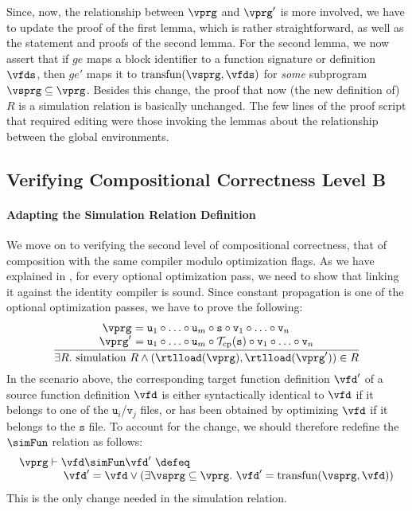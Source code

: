 Since, now, the relationship between $\vprg$ and $\vprg'$ is more involved, 
we have to update the proof of the first lemma, which is rather straightforward,
as well as the statement and proofs of the second lemma.
For the second lemma, we now assert that 
if $ge$ maps a block identifier to a function signature or definition $\vfds$, 
then $ge'$ maps it to $\mathrm{transfun}(\vsprg,\vfds)$ for \emph{some} subprogram $\vsprg\subseteq\vprg$.
Besides this change, 
the proof that now (the new definition of) $R$ is a simulation relation is basically unchanged.
The few lines of the proof script that required editing were those invoking the lemmas about the relationship between the global environments.


\subsection{Verifying Compositional Correctness Level B}

\paragraph{Adapting the Simulation Relation Definition}

We move on to verifying the second level of compositional correctness, that of composition with the same compiler modulo optimization flags.
As we have explained in , for every optional optimization pass, we need to show that linking it against the identity compiler is sound.
Since constant propagation is one of the optional optimization passes, we have to prove the following:
\[
\frac{
\begin{array}{@{}r@{~}l@{}}
\vprg &= \mathtt{u}_1\circ \ldots \circ \mathtt{u}_m\circ\mathtt{s} \circ \mathtt{v}_1\circ \ldots \circ \mathtt{v}_n\\
\vprg' &= \mathtt{u}_1\circ \ldots \circ \mathtt{u}_m\circ\mathcal{T}_{\rm cp}(\mathtt{s}) \circ \mathtt{v}_1\circ \ldots \circ \mathtt{v}_n
\end{array}
}
{\exists R.~ \mathrm{simulation}~R \land 
(\rtlload(\vprg),\rtlload(\vprg'))\in R
}
\]
In the scenario above, the corresponding target function definition $\vfd'$ of a source function definition $\vfd$
is either syntactically identical to $\vfd$ if it belongs to one of the $\mathtt{u}_i$/$\mathtt{v}_j$ files, 
or has been obtained by optimizing $\vfd$ if it belongs to the $\mathtt{s}$ file.
To account for the change, we should therefore redefine the $\simFun$ relation as follows:
\[ 
\begin{array}{l}
\vprg \vdash \vfd \simFun \vfd' ~\defeq~ 
\\\qquad\qquad
\vfd' = \vfd \lor (\exists \vsprg \subseteq \vprg.~ \vfd' = \mathrm{transfun}(\vsprg,\vfd))
\end{array}
\]
This is the only change needed in the simulation relation.

